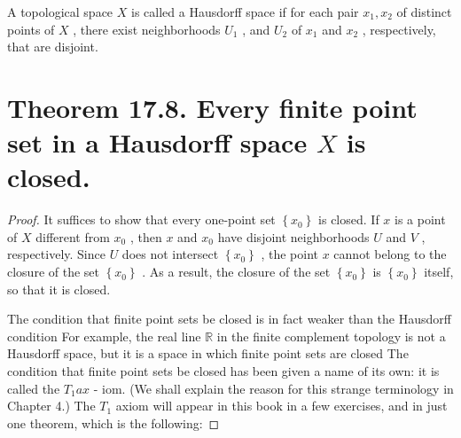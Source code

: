\begin{definition} A topological space \(X\) is called a Hausdorff space if for each pair \({x}_{1},{x}_{2}\) of distinct points of \(X\) , there exist neighborhoods \({U}_{1}\) , and \({U}_{2}\) of \({x}_{1}\) and \({x}_{2}\) , respectively, that are disjoint.
\end{definition}

\section*{Theorem 17.8. Every finite point set in a Hausdorff space \(X\) is closed.}

\begin{proof}
It suffices to show that every one-point set \(\left\{  {x}_{0}\right\}\) is closed. If \(x\) is a point of \(X\) different from \({x}_{0}\) , then \(x\) and \({x}_{0}\) have disjoint neighborhoods \(U\) and \(V\) , respectively. Since \(U\) does not intersect \(\left\{  {x}_{0}\right\}\) , the point \(x\) cannot belong to the closure of the set \(\left\{  {x}_{0}\right\}\) . As a result, the closure of the set \(\left\{  {x}_{0}\right\}\) is \(\left\{  {x}_{0}\right\}\) itself, so that it is closed.

The condition that finite point sets be closed is in fact weaker than the Hausdorff condition For example, the real line \(\mathbb{R}\) in the finite complement topology is not a Hausdorff space, but it is a space in which finite point sets are closed The condition that finite point sets be closed has been given a name of its own: it is called the \({T}_{1}{ax}\) - iom. (We shall explain the reason for this strange terminology in Chapter 4.) The \({T}_{1}\) axiom will appear in this book in a few exercises, and in just one theorem, which is the following:
\end{proof}

